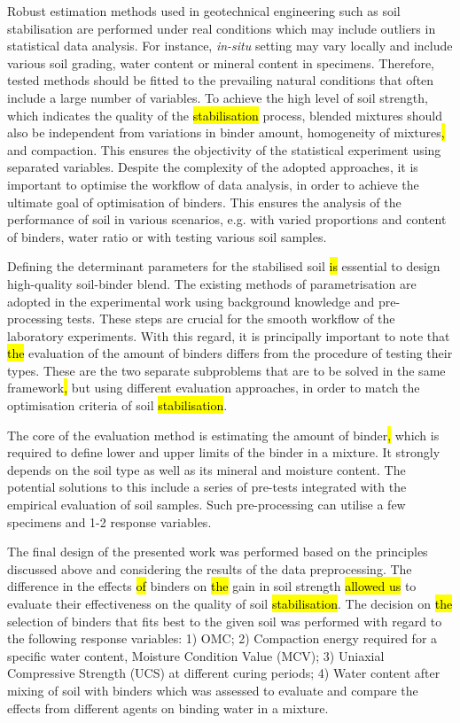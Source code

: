 \documentclass[eprint,
]{actapoly}
\begin{document}
Robust estimation methods used in geotechnical engineering such as soil stabilisation are performed under real conditions which may include outliers in statistical data analysis. For instance, \emph{in-situ} setting may vary locally and include various soil grading, water content or mineral content in specimens. Therefore, tested methods should be fitted to the prevailing natural conditions that often include a large number of variables. To achieve the high level of soil strength, which indicates the quality of the \hl{stabilisation} process, blended mixtures should also be independent from variations in binder amount, homogeneity of mixtures\hl{, }and compaction. This ensures the objectivity of the statistical experiment using separated variables. Despite the complexity of the adopted approaches, it is important to optimise the workflow of data analysis, in order to achieve the ultimate goal of optimisation of binders. This ensures the analysis of the performance of soil in various scenarios, e.g.\hl{ }with varied proportions and content of binders, water ratio or with testing various soil samples.

Defining the determinant parameters for the stabilised soil \hl{is} essential to design high-quality soil-binder blend. The existing methods of parametrisation \cite{LindhNL} are adopted in the experimental work using background knowledge and pre-processing tests. These steps are crucial for the smooth workflow of the laboratory experiments. With this regard, it is principally important to note that \hl{the} evaluation of the amount of binders differs from the procedure of testing their types. These are the two separate subproblems that are to be solved in the same framework\hl{,} but using different evaluation approaches, in order to match the optimisation criteria of soil \hl{stabilisation}. 

The core of the evaluation method is estimating the amount of binder\hl{, }which is required to define lower and upper limits of the binder in a mixture. It strongly depends on the soil type\hl{ }as well as its mineral and moisture content. The potential solutions to this include a series of\hl{ }pre-tests integrated with the empirical evaluation of soil samples. Such pre-processing can utilise a few specimens and 1-2 response variables. 

The final design of the presented work was performed based on the principles discussed above and considering the results of the data preprocessing. The difference in the effects \hl{of} binders on \hl{the} gain in soil strength \hl{allowed us} to evaluate their effectiveness on the quality of soil \hl{stabilisation}. The decision on \hl{the} selection of binders that fits best to the given soil was performed with regard to the following response variables: 1) OMC; 2) Compaction energy required for a specific water content, Moisture Condition Value (MCV); 3) Uniaxial Compressive Strength (UCS) at different curing periods; 4) Water content after mixing of soil with binders which was assessed to evaluate and compare the effects from different agents on binding water in a mixture.
\end{document}
